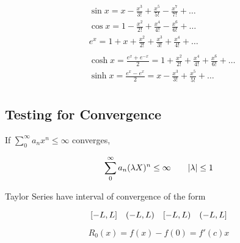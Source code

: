 \documentclass[svgnames]{article}   	%
\begin{document}
\begin{align*}
  &\sin x = x - \frac{x^3}{3!} + \frac{x^5}{5!} - \frac{x^7}{7!} + \dots \\ 
  &\cos x = 1 - \frac{x^2}{2!} + \frac{x^4}{4!} - \frac{x^6}{6!} + \dots \\ 
  &e^x = 1 + x + \frac{x^2}{2!} + \frac{x^3}{3!} + \frac{x^4}{4!} + \dots \\\\
  &\cosh x = \frac{e^x + e^{-x}}{2} = 1 + \frac{x^2}{2!} + \frac{x^4}{4!}
  + \frac{x^6}{6!} + \dots \\
  &\sinh x = \frac{e^x - e^x}{2} = x - \frac{x^3}{3!} + \frac{x^5}{5!} + \dots \\ 
 \end{align*}


\subsection{Testing for Convergence}

If $ \sum_{0}^{\infty} a_n x^n \leq \infty $ converges, 

\vspace{5px} \[
\sum_{0}^{\infty} a_n (\lambda X)^n \leq \infty \hspace{10px}  \hspace{10px}
|\lambda| \leq 1
\] \vspace{5px}

Taylor Series have interval of convergence of the form 

\vspace{5px} \[
  [-L, L] \hspace{10px} (-L, L) \hspace{10px} [-L, L) \hspace{10px} (-L, L]
\] \vspace{5px}

\begin{tcolorbox}[colback = red!5!white, colframe = red!50!black, title
  = Truncated Taylor Series Approximation]
  
 \vspace{5px} \[
 R_0(x) = f(x) - f(0) = f'(c)x
 \] \vspace{5px} 

\end{tcolorbox}

\end{document}
